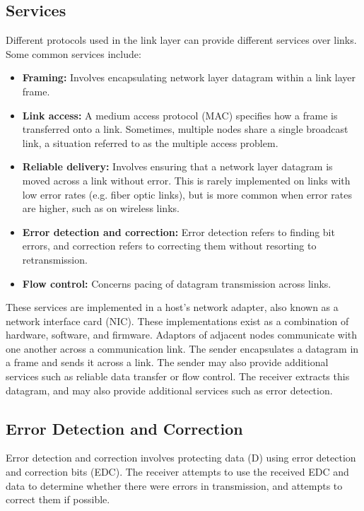 \documentclass[12pt,titlepage]{article}
\begin{document}
    \subsection{Services}
      Different protocols used in the link layer can provide different services over links. Some common services include:
      \begin{itemize}
        \item \textbf{Framing:} Involves encapsulating network layer datagram within a link layer frame.
        \item \textbf{Link access:} A medium access protocol (MAC) specifies how a frame is transferred onto a link. Sometimes, multiple nodes
          share a single broadcast link, a situation referred to as the multiple access problem.
        \item \textbf{Reliable delivery:} Involves ensuring that a network layer datagram is moved across a link without error. This is rarely
          implemented on links with low error rates (e.g. fiber optic links), but is more common when error rates are higher, such as on wireless
          links.
        \item \textbf{Error detection and correction:} Error detection refers to finding bit errors, and correction refers to correcting them without
          resorting to retransmission.
        \item \textbf{Flow control:} Concerns pacing of datagram transmission across links.
      \end{itemize}

      These services are implemented in a host's network adapter, also known as a network interface card (NIC). These implementations exist as a combination
      of hardware, software, and firmware. Adaptors of adjacent nodes communicate with one another across a communication link. The sender encapsulates a datagram
      in a frame and sends it across a link. The sender may also provide additional services such as reliable data transfer or flow control. The receiver extracts
      this datagram, and may also provide additional services such as error detection.

    \subsection{Error Detection and Correction}
      Error detection and correction involves protecting data (D) using error detection and correction bits (EDC). The receiver attempts to use the received EDC
      and data to determine whether there were errors in transmission, and attempts to correct them if possible.
\end{document}
